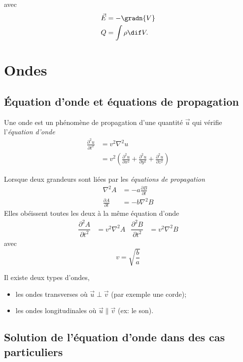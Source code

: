 avec
\begin{align*}
  \vec{E} & = -\gradn{V}\\
  Q & = \int \rho \dif V.
\end{align*}

\section{Ondes}

\subsection{Équation d'onde et équations de propagation}

Une onde est un phénomène de propagation d'une quantité \(\vec{u}\)
 qui vérifie l'\emph{équation d'onde}
\begin{equation*}\begin{split}
\frac{\partial^2 u}{\partial t^2} &= v^2 \nabla^2 u \\
 &= v^2 \left(
 \frac{\partial^2 u}{\partial x^2} +
 \frac{\partial^2 u}{\partial y^2} +
 \frac{\partial^2 u}{\partial z^2}\right)
\end{split}\end{equation*}

Lorsque deux grandeurs sont liées par les \emph{équations de propagation}
\begin{equation}\begin{split}\label{eq:propagation}
    \nabla^2 A & = -a \frac{\partial B}{\partial t} \\
    \frac{\partial A}{\partial t} & = -b \nabla^2 B
\end{split}\end{equation}
Elles obéissent toutes les deux à la même équation d'onde
\begin{align*}
\dfrac{\partial^2 A}{\partial t^2} &= v^2 \nabla^2 A
& \dfrac{\partial^2 B}{\partial t^2} &= v^2 \nabla^2 B
\end{align*}
avec \[v = \sqrt{\frac{b}{a}}\]

Il existe deux types d'ondes,
\begin{itemize}
  \item les ondes transverses où $\vec{u} \perp \vec{v}$ (par exemple une corde);
  \item les ondes longitudinales où $\vec{u} \parallel \vec{v}$ (ex: le son).
\end{itemize}

\subsection[Cas particuliers]{Solution de l'équation d'onde dans des cas particuliers}
